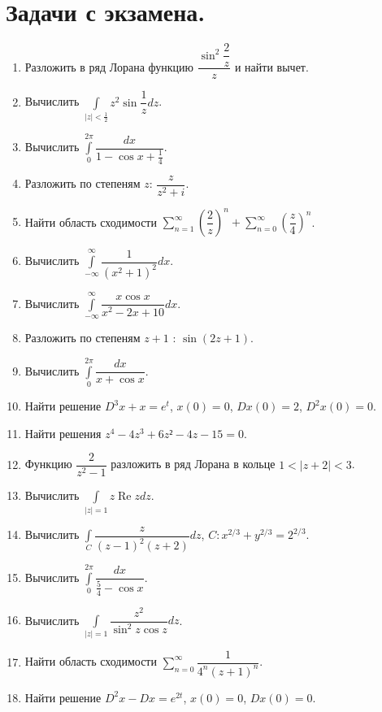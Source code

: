 \documentclass[a4paper, 12pt]{report}
\date{}
\numberwithin{equation}{section}
\renewcommand{\Re}{\operatorname{Re}}
\begin{document}
	\newpage
	\section*{Задачи с экзамена.}
	\begin{enumerate}
		\item Разложить в ряд Лорана функцию $\dfrac{\sin^2 \dfrac 2 z}z$ и найти вычет.
		\item Вычислить $\int\limits_{|z|<\frac12} z^2\sin\dfrac 1z dz$.
		\item Вычислить $\int\limits_0^{2\pi}\dfrac{dx}{1-\cos x + \frac 14}$.
		\item Разложить по степеням $z$: $\dfrac{z}{z^2+i}$.
		\item Найти область сходимости $\sum_{n=1}^{\infty}\left(\dfrac 2 z \right)^n + \sum_{n=0}^{\infty}\left(\dfrac z 4 \right)^n$.
		\item Вычислить $\int\limits_{-\infty}^\infty \dfrac{1}{(x^2+1)^2}dx$.
		\item Вычислить $\int\limits_{-\infty}^\infty \dfrac{x\cos x}{x^2 - 2x + 10}dx$.
		\item Разложить по степеням $z+1$ : $\sin(2z+1)$.
		\item Вычислить $\int\limits_0^{2\pi}\dfrac{dx}{x+\cos x}$.
		\item Найти решение $D^3x+x=e^t$, $x(0)=0$, $Dx(0)=2$, $D^2x(0)=0$.
		\item Найти решения $z^4 - 4z^3 + 6z² - 4z - 15 = 0$.
		\item Функцию $\dfrac{2}{z^2-1}$ разложить в ряд Лорана в кольце $1<|z+2|<3$.
		\item Вычислить $\int\limits_{|z|=1} z \Re z dz$.
		\item Вычислить $\int\limits_{C} \dfrac{z}{(z-1)^2(z+2)} dz$, $C:x^{2/3}+y^{2/3}=2^{2/3}$.
		\item Вычислить $\int\limits_0^{2\pi}\dfrac{dx}{\frac 54-\cos x}$.
		\item Вычислить $\int\limits_{|z|=1} \dfrac{z^2}{\sin^2 z \cos z} dz$.
		\item Найти область сходимости $\sum_{n=0}^\infty \dfrac{1}{4^n(z+1)^n}$.
		\item Найти решение $D^2x-Dx=e^{2t}$, $x(0)=0$, $Dx(0)=0$.
	\end{enumerate}
	
\end{document}
